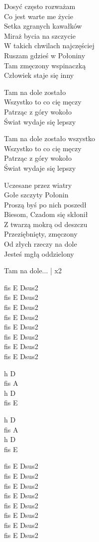 \begin{text}
    Dosyć często rozważam\\
    Co jest warte me życie\\
    Setka zgranych kawałków\\
    Miraż bycia na szczycie\\
    W takich chwilach najczęściej\\
    Ruszam gdzieś w Połoniny\\
    Tam zmęczony wspinaczką\\
    Człowiek staje się inny

    \vin Tam na dole zostało\\
    \vin Wszystko to co cię męczy\\
    \vin Patrząc z góry wokoło\\
    \vin Świat wydaje się lepszy

    \vin Tam na dole zostało wszystko\\
    \vin Wszystko to co cię męczy\\
    \vin Patrząc z góry wokoło\\
    \vin Świat wydaje się lepszy

    Uczesane przez wiatry\\
    Gołe szczyty Połonin\\
    Proszą byś po nich poszedł\\
    Biesom, Czadom się skłonił\\
    Z twarzą mokrą od deszczu\\
    Przeziębnięty, zmęczony\\
    Od złych rzeczy na dole\\
    Jesteś mgłą oddzielony

    \vin Tam na dole... | x2
\end{text}
\begin{chord}
    fis E Dsus2\\
    fis E Dsus2\\
    fis E Dsus2\\
    fis E Dsus2\\
    fis E Dsus2\\
    fis E Dsus2\\
    fis E Dsus2\\
    fis E Dsus2

    h D\\
    fis A\\
    h D\\
    fis E
    
    h D\\
    fis A\\
    h D\\
    fis E

    fis E Dsus2\\
    fis E Dsus2\\
    fis E Dsus2\\
    fis E Dsus2\\
    fis E Dsus2\\
    fis E Dsus2\\
    fis E Dsus2\\
    fis E Dsus2
\end{chord}

